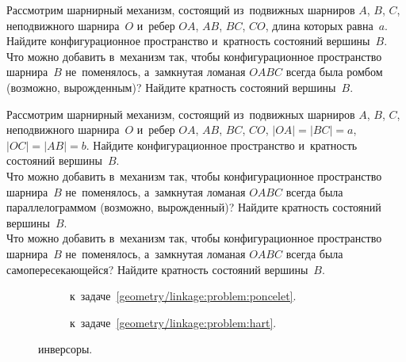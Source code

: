 \begin{problems}

\item
\sp
Рассмотрим шарнирный механизм, состоящий из~подвижных шарниров $A$, $B$, $C$,
неподвижного шарнира~$O$ и~ребер $OA$, $AB$, $BC$, $CO$, длина которых
равна~$a$.
Найдите конфигурационное пространство и~кратность состояний вершины~$B$.
\\
\sp{}
\label{geometry/linkage:problem:rombus}%
Что можно добавить в~механизм так, чтобы конфигурационное пространство
шарнира~$B$ не~поменялось, а~замкнутая ломаная $OABC$ всегда была ромбом
(возможно, вырожденным)?
Найдите кратность состояний вершины~$B$.

\item
\sp
Рассмотрим шарнирный механизм, состоящий из~подвижных шарниров $A$, $B$, $C$,
неподвижного шарнира~$O$ и~ребер $OA$, $AB$, $BC$, $CO$,
$|OA| = |BC| = a$, $|OC| = |AB| = b$.
Найдите конфигурационное пространство и~кратность состояний вершины~$B$.
\\
\sp{}
Что можно добавить в~механизм так, чтобы конфигурационное пространство
шарнира~$B$ не~поменялось, а~замкнутая ломаная $OABC$ всегда была
параллелограммом (возможно, вырожденный)?
Найдите кратность состояний вершины~$B$.
\\
\sp{}
\label{geometry/linkage:problem:antiparallelogram}%
Что можно добавить в~механизм так, чтобы конфигурационное пространство
шарнира~$B$ не~поменялось, а~замкнутая ломаная $OABC$ всегда была
самопересекающейся?
Найдите кратность состояний вершины~$B$.

\begin{figure}[ht]
\strut\hfill
\begin{subfigure}[b]{0.45\linewidth}
\begin{center}
    \caption{к~задаче~\ref{geometry/linkage:problem:poncelet}.}
    \label{geometry/linkage:problem:poncelet:fig}
\end{center}
\end{subfigure}%
\hfill
\begin{subfigure}[b]{0.35\linewidth}
\begin{center}
    \caption{к~задаче~\ref{geometry/linkage:problem:hart}.}
    \label{geometry/linkage:problem:hart:fig}
\end{center}
\end{subfigure}
\hfill\strut
\caption{инверсоры.}
\end{figure}


\end{problems}
